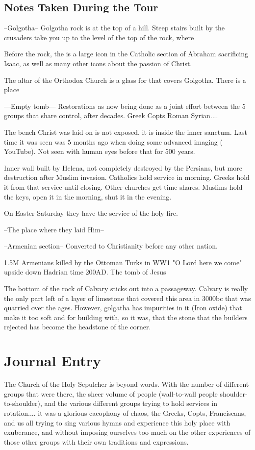 \documentclass[letterpaper]{report}
\begin{document}
\subsection{Notes Taken During the Tour}
--Golgotha--
Golgotha rock is at the top of a hill. Steep stairs built by the crusaders take you up to the level of the top of the rock, where 

Before the rock, the is a large icon in the Catholic section of Abraham sacrificing Isaac, as well as many other icons about the passion of Christ. 

The altar of the Orthodox Church is a glass for that covers Golgotha. There is a place

---Empty tomb---
Restorations as now being done as a joint effort between the 5 groups that share control, after decades. Greek Copts Roman Syrian....

The bench Christ was laid on is not exposed, it is inside the inner sanctum. Last time it was seen was 5 months ago when doing some advanced imaging ( YouTube). Not seen with human eyes before that for 500 years.

Inner wall built by Helena, not completely destroyed by the Persians, but more destruction after Muslim invasion.
Catholics hold service in morning. Greeks hold it from that service until closing. Other churches get time-shares.
Muslims hold the keys, open it in the morning, shut it in the evening.

On Easter Saturday they have the service of the holy fire. 

--The place where they laid Him--

--Armenian section--
Converted to Christianity before any other nation.

1.5M Armenians killed by the Ottoman Turks in WW1
"O Lord here we come" upside down Hadrian time 200AD. The tomb of Jesus 

The bottom of the rock of Calvary sticks out into a passageway. Calvary is really the only part left of a layer of limestone that covered this area in 3000bc that was quarried over the ages.
However, golgatha has impurities in it (Iron oxide)
that make it too soft and  for building with,
so it was, that the stone that the builders rejected has become the headstone of the corner.

\clearpage
\section{Journal Entry}
The Church of the Holy Sepulcher is beyond words.
With the number of different
groups that were there,
the sheer volume of people (wall-to-wall people shoulder-to-shoulder),
and the various different groups trying to hold services in rotation.... it was a glorious cacophony of chaos, the Greeks, Copts, Franciscans, and us all trying to sing various hymns and experience this holy place with exuberance, and without imposing ourselves too much on the other experiences of those other groups with their own traditions and expressions.
\end{document}
